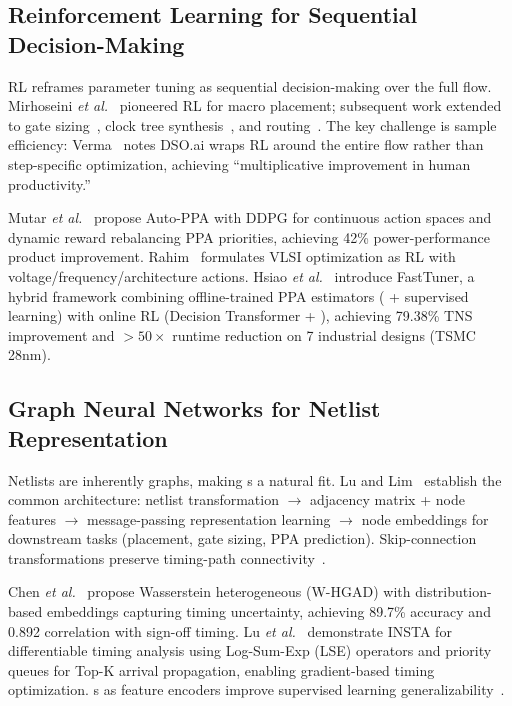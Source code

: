 \documentclass[10pt,conference]{IEEEtran}
\newcommand{\etal}{\textit{et al.}}
\newcommand{\PPO}{\text{PPO}}
\newcommand{\GNN}{\text{GNN}}
\begin{document}
\subsection{Reinforcement Learning for Sequential Decision-Making}
\label{sec:rl_sequential}

RL reframes parameter tuning as sequential decision-making over the full flow. Mirhoseini \etal~\cite{mirhoseini2020chip} pioneered RL for macro placement; subsequent work extended to gate sizing~\cite{lu2021rl}, clock tree synthesis~\cite{lu2022advancing}, and routing~\cite{lu2024solvers}. The key challenge is sample efficiency: Verma~\cite{verma2024dso} notes DSO.ai wraps RL around the entire flow rather than step-specific optimization, achieving ``multiplicative improvement in human productivity.''

Mutar \etal~\cite{mutar2026auto} propose Auto-PPA with DDPG for continuous action spaces and dynamic reward rebalancing PPA priorities, achieving 42\% power-performance product improvement. Rahim~\cite{rahim2026machine} formulates VLSI optimization as RL with voltage/frequency/architecture actions. Hsiao \etal~\cite{hsiao2026fasttuner} introduce FastTuner, a hybrid framework combining offline-trained PPA estimators (\GNN{} + supervised learning) with online RL (Decision Transformer + \PPO{}), achieving 79.38\% TNS improvement and $>50\times$ runtime reduction on 7 industrial designs (TSMC 28nm).

\subsection{Graph Neural Networks for Netlist Representation}
\label{sec:gnn_netlist}

Netlists are inherently graphs, making \GNN{}s a natural fit. Lu and Lim~\cite{lu2022advancing} establish the common \GNN{} architecture: netlist transformation $\rightarrow$ adjacency matrix + node features $\rightarrow$ message-passing representation learning $\rightarrow$ node embeddings for downstream tasks (placement, gate sizing, PPA prediction). Skip-connection transformations preserve timing-path connectivity~\cite{lu2022advancing}.

Chen \etal~\cite{chen2025graph} propose Wasserstein heterogeneous \GNN{} (W-HGAD) with distribution-based embeddings capturing timing uncertainty, achieving 89.7\% accuracy and 0.892 correlation with sign-off timing. Lu \etal~\cite{lu2023insta} demonstrate INSTA for differentiable timing analysis using Log-Sum-Exp (LSE) operators and priority queues for Top-K arrival propagation, enabling gradient-based timing optimization. \GNN{}s as feature encoders improve supervised learning generalizability~\cite{lu2022advancing,hsiao2026fasttuner}.
\end{document}
